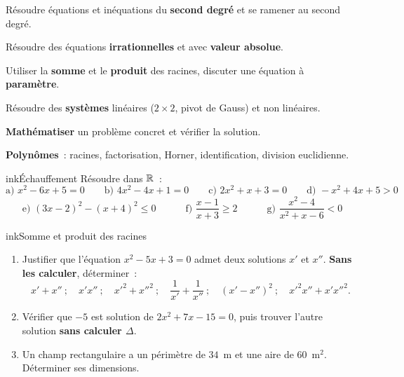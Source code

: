 \def\piedfiche{TD n°1 · 1ère S2}



\begin{competences}
  \item Résoudre équations et inéquations du \textbf{second degré} et se ramener au second degré.
  \item Résoudre des équations \textbf{irrationnelles} et avec \textbf{valeur absolue}.
  \item Utiliser la \textbf{somme} et le \textbf{produit} des racines, discuter une équation à \textbf{paramètre}.
  \item Résoudre des \textbf{systèmes} linéaires ($2\times2$, pivot de Gauss) et non linéaires.
  \item \textbf{Mathématiser} un problème concret et vérifier la solution.
  \item \textbf{Polynômes}~: racines, factorisation, Horner, identification, division euclidienne.
\end{competences}


\begin{exo}{ink}{Échauffement }
Résoudre dans $\mathbb{R}$~:
\[
\text{a) } x^2-6x+5=0 \qquad \text{b) } 4x^2-4x+1=0 \qquad \text{c) } 2x^2+x+3=0 \qquad \text{d) } -x^2+4x+5>0
\]
\[
\text{e) } (3x-2)^2-(x+4)^2\leq0 \qquad\quad \text{f) } \frac{x-1}{x+3}\geq 2 \qquad\quad \text{g) } \frac{x^2-4}{x^2+x-6}<0
\]
\end{exo}

\begin{exo}{ink}{Somme et produit des racines }
\begin{enumerate}
  \item Justifier que l'équation $x^2-5x+3=0$ admet deux solutions $x'$ et $x''$. \textbf{Sans les calculer}, déterminer~:
  \[ x'+x''\ ;\quad x'x''\ ;\quad x'^2+x''^2\ ;\quad \frac1{x'}+\frac1{x''}\ ;\quad (x'-x'')^2\ ;\quad x'^2x''+x'x''^2. \]
  \item Vérifier que $-5$ est solution de $2x^2+7x-15=0$, puis trouver l'autre solution \textbf{sans calculer $\Delta$}.
  \item Un champ rectangulaire a un périmètre de $34$~m et une aire de $60$~m$^2$. Déterminer ses dimensions.
\end{enumerate}
\end{exo}


